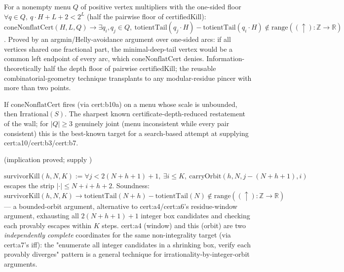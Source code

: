 \begin{thm}
For a nonempty menu $Q$ of positive vertex multipliers with the one-sided floor $\forall q\in Q,\ q\cdot H + L + 2 < 2^L$ (half the pairwise floor of $\mathrm{certifiedKill}$): $\mathrm{coneNonflatCert}(H,L,Q) \to \exists q_i,q_j \in Q,\ \mathrm{totientTail}(q_j\cdot H) - \mathrm{totientTail}(q_i\cdot H) \notin \mathrm{range}((\uparrow):\mathbb{Z}\to\mathbb{R})$. Proved by an argmin/Helly-avoidance argument over one-sided arcs: if all vertices shared one fractional part, the minimal-deep-tail vertex would be a common left endpoint of every arc, which $\mathrm{coneNonflatCert}$ denies. Information-theoretically half the depth floor of pairwise $\mathrm{certifiedKill}$; the reusable combinatorial-geometry technique transplants to any modular-residue pincer with more than two points.
\par\noindent{}   
\end{thm}

\begin{thm}
If $\mathrm{coneNonflatCert}$ fires (via cert:b10a) on a menu whose scale is unbounded, then $\mathrm{Irrational}(S)$. The sharpest known certificate-depth-reduced restatement of the wall; for $|Q|\ge3$ genuinely joint (menu inconsistent while every pair consistent) this is the best-known target for a search-based attempt at supplying cert:a10/cert:b3/cert:b7.
\par\noindent{} (implication proved; supply )   
\end{thm}

\begin{prop}
$\mathrm{survivorKill}(h,N,K) := \forall j < 2(N+h+1)+1,\ \exists i\le K,\ \mathrm{carryOrbit}(h,N,j-(N+h+1),i)$ escapes the strip $|\cdot|\le N+i+h+2$. Soundness: $\mathrm{survivorKill}(h,N,K) \to \mathrm{totientTail}(N+h)-\mathrm{totientTail}(N)\notin\mathrm{range}((\uparrow):\mathbb{Z}\to\mathbb{R})$ — a bounded-orbit argument, alternative to cert:a4/cert:a6's residue-window argument, exhausting all $2(N+h+1)+1$ integer box candidates and checking each provably escapes within $K$ steps. cert:a4 (window) and this (orbit) are two \emph{independently complete} coordinates for the same non-integrality target (via cert:a7's iff): the "enumerate all integer candidates in a shrinking box, verify each provably diverges" pattern is a general technique for irrationality-by-integer-orbit arguments.
\par\noindent{}    
\end{prop}

